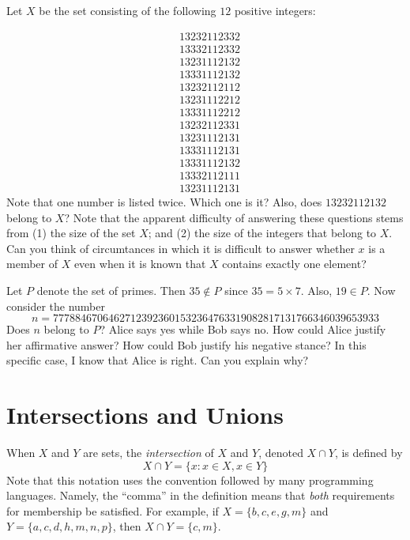\begin{example}
Let $X$ be the set consisting of the following $12$ positive
integers:

\begin{align*}
&13232112332\\
&13332112332\\
&13231112132\\
&13331112132\\
&13232112112\\
&13231112212\\
&13331112212\\
&13232112331\\
&13231112131\\
&13331112131\\
&13331112132\\
&13332112111\\
&13231112131
\end{align*}
Note that one number is listed twice.  Which one is it?
Also, does $13232112132$ belong to $X$?  Note that the
apparent difficulty of answering these questions stems from
(1) the size of the set $X$; and (2) the size of the integers 
that belong to $X$.  Can you think of circumtances in which
it is difficult to answer whether $x$ is a member of $X$
even when it is known that $X$ contains exactly one element?
\end{example}

\begin{example}
Let $P$ denote the set of primes.  Then $35\notin P$ since
$35= 5\times 7$.  Also, $19\in P$.  Now consider the number
\[
n = 77788467064627123923601532364763319082817131766346039653933
\]
Does $n$ belong to $P$?  Alice says yes while Bob says no.
How could Alice justify her affirmative answer?  How could Bob
justify his negative stance?  In this specific case, I know that
Alice is right.  Can you explain why?
\end{example}

\section{Intersections and Unions}

When $X$ and $Y$ are sets, the \textit{intersection}
of $X$ and $Y$, denoted $X\cap Y$, is defined by
\[
X\cap Y = \{x: x\in X, x\in Y\}
\]
Note that this notation uses the convention followed by
many programming languages. Namely, the ``comma'' in the
definition means that \textit{both} requirements for
membership be satisfied.  For example, if $X=\{b,c,e,g,m\}$
and $Y=\{a,c,d,h,m,n,p\}$, then $X\cap Y=\{c,m\}$.

